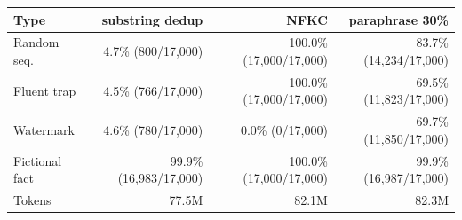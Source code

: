 \begin{tabular}{lrrr}
\toprule
Type & substring dedup & NFKC & paraphrase 30\% \\
\midrule
Random seq. & 4.7\% (800/17,000) & 100.0\% (17,000/17,000) & 83.7\% (14,234/17,000) \\
Fluent trap & 4.5\% (766/17,000) & 100.0\% (17,000/17,000) & 69.5\% (11,823/17,000) \\
Watermark & 4.6\% (780/17,000) & 0.0\% (0/17,000) & 69.7\% (11,850/17,000) \\
Fictional fact & 99.9\% (16,983/17,000) & 100.0\% (17,000/17,000) & 99.9\% (16,987/17,000) \\
\midrule
Tokens & 77.5M & 82.1M & 82.3M \\
\bottomrule
\end{tabular}
